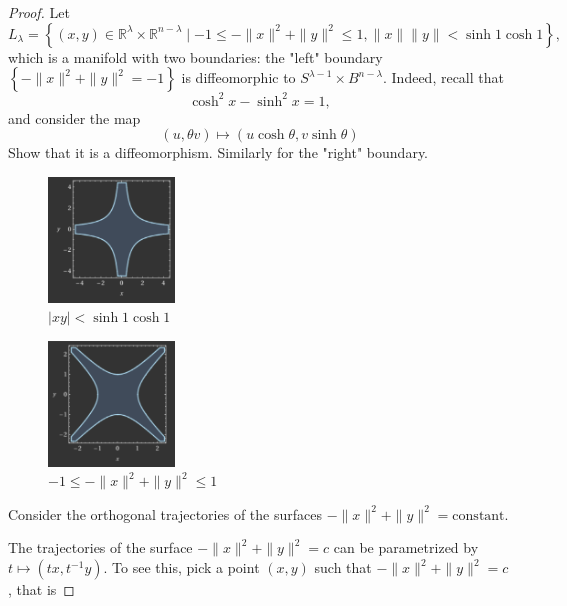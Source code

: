\documentclass[reqno]{amsart}
\theoremstyle{definition}
\theoremstyle{remark}
\begin{document}
\begin{proof}
    Let
    \[
    L_{\lambda} = 
    \left\{ \left( x,y \right) 
    \in \mathbb{R}^{\lambda} \times 
\mathbb{R}^{n-\lambda}  \mid 
-1 \le - \|x\|^2 + \|y\|^2 \le 1,
\|x\|\|y\| < \sinh 1 \cosh 1\right\},
    \] 
    which is a manifold with two boundaries:
    the "left" boundary
    $\left\{ -\|x\|^2+ \|y\|^2 = -1 \right\} $ is
    diffeomorphic to
    $S^{\lambda-1} \times B^{n-\lambda}$.
    Indeed, recall that
    \[
    \cosh^2 x - \sinh^2 x = 1,
    \] 
    and consider the
    map
    \[
        \left( u, \theta v \right) 
        \mapsto \left( u \cosh \theta, v
        \sinh \theta \right) 
    \] 
    Show that it is a diffeomorphism. Similarly for
    the "right" boundary.

    \begin{figure}[htpb]
        \centering
        \includegraphics[width=0.3\textwidth]{xy-graph.png}
        \caption{$\left| xy \right| < \sinh 1 \cosh 1$}
        \label{fig:xy-graph-png}
    \end{figure}

    \begin{figure}[htpb]
        \centering
        \includegraphics[width=0.3\textwidth]{y^2-x^2-graph.png}
        \caption{$-1 \le -\|x\|^2 + \|y\|^2 \le 1$}
        \label{fig:y-2-x-2-graph-png}
    \end{figure}


    Consider the orthogonal trajectories of
    the surfaces $-\|x\|^2 + \|y\|^2 = \text{constant}$.

    The trajectories of the surface
    $- \|x\|^2 + \|y\|^2 = c$ can be parametrized
    by
    $t \mapsto \left( t x, t^{-1} y \right) $. 
    To see this, pick a point
    $(x,y) $ such that
    $-\|x\|^2 + \|y\|^2 = c$, that is


\end{proof}
\end{document}
